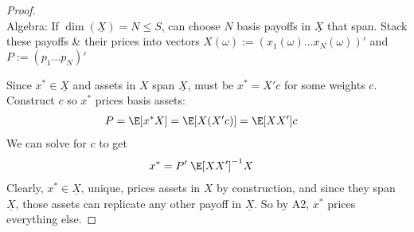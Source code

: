 \documentclass[12pt]{article}
\theoremstyle{plain}
\theoremstyle{definition}
\theoremstyle{remark}
\begin{document}
\begin{multicols*}{2}
\begin{proof}
\vspace{10pt}

\\
Algebra: If $\dim(\underline{X})=N\leq S$, can choose $N$ basis payoffs
in $\underline{X}$ that span. Stack these payoffs \& their prices
into vectors
$X(\omega):=(x_1(\omega)\ldots x_N(\omega))'$ and
$P:=(p_1\ldots p_N)'$

Since $x^*\in\underline{X}$ and assets in $X$ span $\underline{X}$, must
be $x^*=X'c$ for some weights $c$. Construct $c$ so $x^*$ prices basis
assets:
\begin{align*}
  P &= \E[x^*X] = \E[X(X'c)] = \E[XX']c
\end{align*}
We can solve for $c$ to get
\begin{align*}
  x^* &= P'\;\E[XX']^{-1}X
\end{align*}
Clearly, $x^*\in\underline{X}$, unique, prices assets in $X$ by
construction, and since they span $\underline{X}$, those assets can
replicate any other payoff in $\underline{X}$. So by A2, $x^*$ prices
everything else.
\end{proof}



\end{multicols*}
\end{document}
